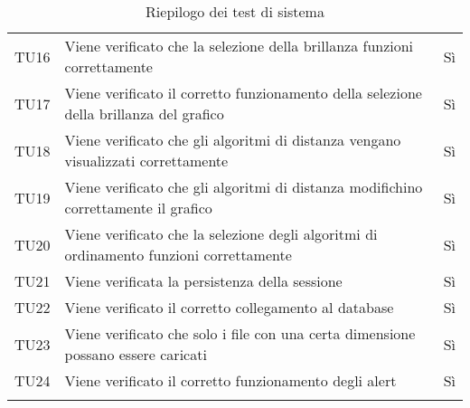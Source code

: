 \documentclass[../piano_di_qualifica.tex]{subfiles}
\begin{document}
\begin{center}
\begin{longtable}{|c|p{10cm}|c|}
		TU16              & Viene verificato che la selezione della brillanza funzioni correttamente                & Sì                         \\
		TU17              & Viene verificato il corretto funzionamento della selezione della brillanza del grafico  & Sì                         \\
		TU18              & Viene verificato che gli algoritmi di distanza vengano visualizzati correttamente       & Sì                         \\
		TU19              & Viene verificato che gli algoritmi di distanza modifichino correttamente il grafico     & Sì                         \\
		TU20              & Viene verificato che la selezione degli algoritmi di ordinamento funzioni correttamente & Sì                         \\
		TU21              & Viene verificata la persistenza della sessione                                          & Sì                         \\
		TU22              & Viene verificato il corretto collegamento al database                                   & Sì                         \\
		TU23              & Viene verificato che solo i file con una certa dimensione possano essere caricati       & Sì                         \\
		TU24              & Viene verificato il corretto funzionamento degli alert                                  & Sì                         \\
		\hline
		\rowcolor{white}
		\caption{Riepilogo dei test di sistema}
	\end{longtable}
\end{center}
\end{document}
